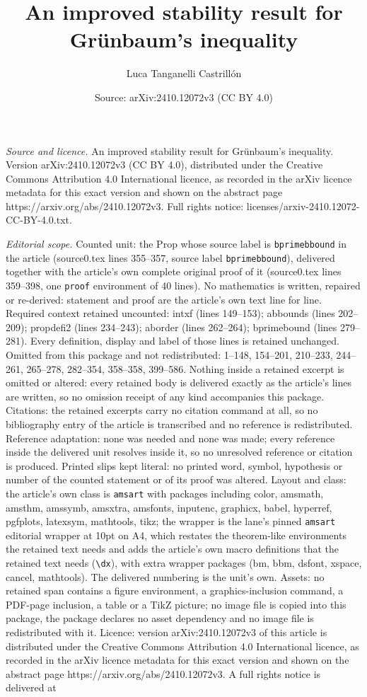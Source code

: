 \documentclass[10pt,a4paper]{amsart}
\title[An improved stability result for Gr\"unbaum's inequality]{An improved stability result for Gr\"unbaum's inequality}
\author{Luca Tanganelli Castrill\'on}
\date{Source: arXiv:2410.12072v3 (CC BY 4.0)}
\begin{document}
\maketitle

\noindent\emph{Source and licence.} An improved stability result for Gr\"unbaum's inequality. Version arXiv:2410.12072v3 (CC BY 4.0), distributed under the Creative Commons Attribution 4.0 International licence, as recorded in the arXiv licence metadata for this exact version and shown on the abstract page https://arxiv.org/abs/2410.12072v3. Full rights notice: licenses/arxiv-2410.12072-CC-BY-4.0.txt.\par\smallskip

\noindent\textit{Editorial scope.} Counted unit: the Prop whose source label is \texttt{bprimebbound} in the article (source0.tex lines 355--357, source label \texttt{bprimebbound}), delivered together with the article's own complete original proof of it (source0.tex lines 359--398, one \texttt{proof} environment of 40 lines). No mathematics is written, repaired or re-derived: statement and proof are the article's own text line for line. Required context retained uncounted: intxf (lines 149--153); abbounds (lines 202--209); propdefi2 (lines 234--243); aborder (lines 262--264); bprimebound (lines 279--281). Every definition, display and label of those lines is retained unchanged. Omitted from this package and not redistributed: 1--148, 154--201, 210--233, 244--261, 265--278, 282--354, 358--358, 399--586. Nothing inside a retained excerpt is omitted or altered: every retained body is delivered exactly as the article's lines are written, so no omission receipt of any kind accompanies this package. Citations: the retained excerpts carry no citation command at all, so no bibliography entry of the article is transcribed and no reference is redistributed. Reference adaptation: none was needed and none was made; every reference inside the delivered unit resolves inside it, so no unresolved reference or citation is produced. Printed slips kept literal: no printed word, symbol, hypothesis or number of the counted statement or of its proof was altered. Layout and class: the article's own class is \texttt{amsart} with packages including color, amsmath, amsthm, amssymb, amsxtra, amsfonts, inputenc, graphicx, babel, hyperref, pgfplots, latexsym, mathtools, tikz; the wrapper is the lane's pinned \texttt{amsart} editorial wrapper at 10pt on A4, which restates the theorem-like environments the retained text needs and adds the article's own macro definitions that the retained text needs (\texttt{\textbackslash dx}), with extra wrapper packages (bm, bbm, dsfont, xspace, cancel, mathtools). The delivered numbering is the unit's own. Assets: no retained span contains a figure environment, a graphics-inclusion command, a PDF-page inclusion, a table or a TikZ picture; no image file is copied into this package, the package declares no asset dependency and no image file is redistributed with it. Licence: version arXiv:2410.12072v3 of this article is distributed under the Creative Commons Attribution 4.0 International licence, as recorded in the arXiv licence metadata for this exact version and shown on the abstract page https://arxiv.org/abs/2410.12072v3. A full rights notice is delivered at 
\end{document}
